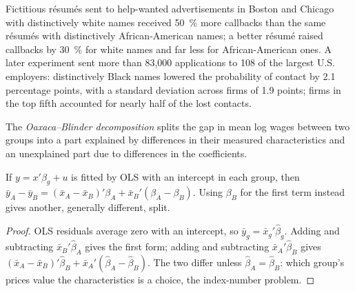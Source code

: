 \begin{record}
Fictitious résumés sent to help-wanted advertisements in Boston and Chicago with
distinctively white names received 50~\% more callbacks than the same résumés with
distinctively African-American names; a better résumé raised callbacks by 30~\% for
white names and far less for African-American ones. %
A later experiment sent more than 83{,}000 applications to 108 of the largest U.S.
employers: distinctively Black names lowered the probability of contact by 2.1
percentage points, with a standard deviation across firms of 1.9 points; firms in the top
fifth accounted for nearly half of the lost contacts. %
\end{record}

\begin{definition}\label{def:b3:wage-structure:oaxaca}
The \emph{Oaxaca--Blinder decomposition} splits the gap in mean log wages between two
groups into a part explained by differences in their measured characteristics and
an unexplained part due to differences in the coefficients.
\end{definition}

\begin{proposition}\label{prop:b3:wage-structure:oaxaca}
If $y = x'\beta_g + u$ is fitted by OLS with an intercept in each group, then $\bar y_A - \bar y_B = (\bar x_A - \bar x_B)'\beta_A +
\bar x_B'(\beta_A - \beta_B)$. Using $\beta_B$ for the first term instead gives another, generally different, split.
\end{proposition}

\begin{proof}
OLS residuals average zero with an intercept, so $\bar y_g = \bar x_g'\hat\beta_g$. Adding and subtracting $\bar x_B'\hat\beta_A$ gives
the first form; adding and subtracting $\bar x_A'\hat\beta_B$ gives $(\bar x_A - \bar x_B)'\hat\beta_B + \bar x_A'(\hat\beta_A - \hat\beta_B)$. The two differ
unless $\hat\beta_A = \hat\beta_B$: which group's prices value the characteristics is a choice, the
index-number problem.
\end{proof}

